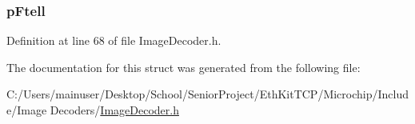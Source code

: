 \subsubsection[{p\+Ftell}]{ p\+Ftell}\label{struct___i_m_g___f_i_l_e___s_y_s_t_e_m___a_p_i_a3943837ac285894b006a68973c748cdc}


Definition at line 68 of file Image\+Decoder.\+h.



The documentation for this struct was generated from the following file\+:\begin{DoxyCompactItemize}
\item 
C\+:/\+Users/mainuser/\+Desktop/\+School/\+Senior\+Project/\+Eth\+Kit\+T\+C\+P/\+Microchip/\+Include/\+Image Decoders/\hyperlink{_image_decoder_8h}{Image\+Decoder.\+h}\end{DoxyCompactItemize}
